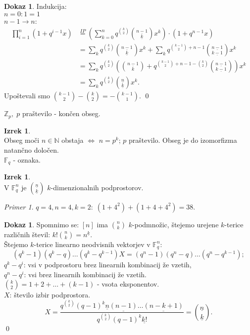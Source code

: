 \documentclass[a4paper, 12pt]{book}
\theoremstyle{definition}
\newtheorem{theorem}[counter]{Izrek}
\newtheorem{pro}[counter]{Dokaz}
\theoremstyle{remark}
\newtheorem*{ex}{Primer}
\newcommand{\N}{\mathbb{N}}
\newcommand{\Z}{\mathbb{Z}}
\newcommand{\F}{\mathbb{F}}
\begin{document}
\begin{pro}
  Indukcija: \\
  $n = 0: 1 = 1$ \\
  $n - 1 \to n$:
  \begin{align*}
    \prod_{i=1}^{n} (1 + q^{i-1}x)
    &\stackrel{IP}{=} \left(\sum_{k=0}^{n} q^{\binom{k}{2}} \binom{\underline{n-1}}{\underline{k}} x^k\right)
      \cdot (1 + q^{n-1}x) \\
    &= \sum_k q^{\binom{k}{2}} \binom{\underline{n-1}}{\underline{k}} x^k
      + \sum_k q^{\binom{k-1}{2}+n-1} \binom{\underline{n-1}}{\underline{k-1}} x^k \\
    &= \sum_k q^{\binom{k}{2}} \left(\binom{\underline{n-1}}{k} +
      q^{\binom{k-1}{2}+n-1-\binom{k}{2}} \binom{\underline{n-1}}{\underline{k-1}}\right) x^k \\
    &= \sum_k q^{\binom{k}{2}} \binom{\underline{n}}{\underline{k}} x^k.
  \end{align*}
  Upoštevali smo $\binom{k-1}{2} - \binom{k}{2} = - \binom{k-1}{1}$.
  \qed
\end{pro}
$\Z_p, \; p$ praštevilo - končen obseg.
\begin{theorem} \text{} \\
  Obseg moči $n \in \N$ obstaja $\iff$ $n = p^k$; $p$ praštevilo.
  Obseg je do izomorfizma natančno določen. \\
  $\F_q$ - oznaka.
\end{theorem}
\begin{theorem} \text{} \\
  V $\F_q^n$ je $\binom{\underline{n}}{\underline{k}}$ $k$-dimenzionalnih podprostorov.
\end{theorem}
\begin{ex}
  $q=4, n=4, k=2: \; (1 + 4^2) + (1 + 4 + 4^2) = 38$.
\end{ex}
\begin{pro}
  Spomnimo se: $[n]$ ima $\binom{n}{k}$ $k$-podmnožic,
  štejemo urejene $k$-terice različnih števil: $k! \binom{n}{k} = n^{\underline{k}}$. \\
  Štejemo $k$-terice linearno neodvisnih vektorjev v $\F_q^n$:
  \begin{equation*}
    (q^k-1) (q^k-q) \dots (q^k - q^{k-1}) X = (q^n-1) (q^n-q) \dots (q^n - q^{k-1});
  \end{equation*}
  $q^k - q^i$: vsi v podprostoru brez linearnih kombinacij že vzetih, \\
  $q^n - q^i$: vsi brez linearnih kombinacij že vzetih. \\
  $\binom{k}{2} = 1 + 2 + \dots + (k-1)$ - vsota eksponentov. \\
  $X$: število izbir podprostora.
  \begin{equation*}
    X = \frac{q^{\binom{k}{2}} (q-1)^k \underline{n} \underline{(n-1)} \dots \underline{(n-k+1)}}
      {q^{\binom{k}{2}} (q-1)^k \underline{k!}} = \binom{\underline{n}}{\underline{k}}.
  \end{equation*}
  \qed
\end{pro}
\end{document}
